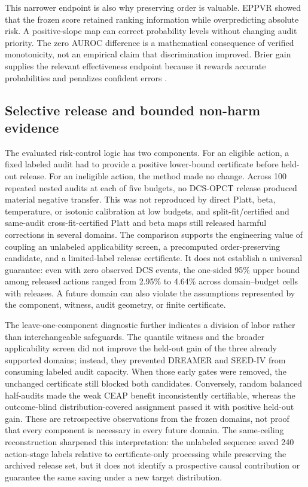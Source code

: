 \documentclass[preprint,12pt]{elsarticle}
\begin{document}
This narrower endpoint is also why preserving order is valuable. EPPVR showed that the frozen score retained ranking information while overpredicting absolute risk. A positive-slope map can correct probability levels without changing audit priority. The zero AUROC difference is a mathematical consequence of verified monotonicity, not an empirical claim that discrimination improved. Brier gain supplies the relevant effectiveness endpoint because it rewards accurate probabilities and penalizes confident errors \cite{brier1950verification}.

\subsection{Selective release and bounded non-harm evidence}

The evaluated risk-control logic has two components. For an eligible action, a fixed labeled audit had to provide a positive lower-bound certificate before held-out release. For an ineligible action, the method made no change. Across 100 repeated nested audits at each of five budgets, no DCS-OPCT release produced material negative transfer. This was not reproduced by direct Platt, beta, temperature, or isotonic calibration at low budgets, and split-fit/certified and same-audit cross-fit-certified Platt and beta maps still released harmful corrections in several domains. The comparison supports the engineering value of coupling an unlabeled applicability screen, a precomputed order-preserving candidate, and a limited-label release certificate. It does not establish a universal guarantee: even with zero observed DCS events, the one-sided 95\% upper bound among released actions ranged from 2.95\% to 4.64\% across domain--budget cells with releases. A future domain can also violate the assumptions represented by the component, witness, audit geometry, or finite certificate.

The leave-one-component diagnostic further indicates a division of labor rather than interchangeable safeguards. The quantile witness and the broader applicability screen did not improve the held-out gain of the three already supported domains; instead, they prevented DREAMER and SEED-IV from consuming labeled audit capacity. When those early gates were removed, the unchanged certificate still blocked both candidates. Conversely, random balanced half-audits made the weak CEAP benefit inconsistently certifiable, whereas the outcome-blind distribution-covered assignment passed it with positive held-out gain. These are retrospective observations from the frozen domains, not proof that every component is necessary in every future domain. The same-ceiling reconstruction sharpened this interpretation: the unlabeled sequence saved 240 action-stage labels relative to certificate-only processing while preserving the archived release set, but it does not identify a prospective causal contribution or guarantee the same saving under a new target distribution.
\end{document}
